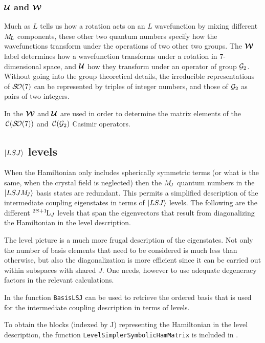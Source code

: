 \documentclass{article}
\newcommand{\codetext}[1]{{\color{BlueViolet} \texttt{#1}}}
\begin{document}
\subsubsection{$\boldsymbol{\mathcal{U}}$ and $\boldsymbol{\mathcal{W}}$}

Much as $L$ tells us how a rotation acts on an $L$ wavefunction by mixing different $M_{\!{L}}$ components, these other two quantum numbers specify how the wavefunctions transform under the operations of two other two groups. The $\boldsymbol{\mathcal{W}}$ label determines how a wavefunction transforms under a rotation in 7-dimensional space, and $\boldsymbol{\mathcal{U}}$ how they transform under an operator of group $\mathcal{G}_2$. Without going into the group theoretical details, the irreducible representations of $\mathcal{S\!O}(7)$ can be represented by triples of integer numbers, and those of $\mathcal{G}_2$ as pairs of two integers.

In \qlanth the $\boldsymbol{\mathcal{W}}$ and $\boldsymbol{\mathcal{U}}$ are used in order to determine the matrix elements of the $\,\mathcal{C}(\mathcal{S\!O}(7))$ and $\,\mathcal{C}(\mathcal{G}_2)$ Casimir operators.

\subsection{$|LSJ\rangle$ levels}

When the Hamiltonian only includes spherically symmetric terms (or what is the same, when the crystal field is neglected) then the $M_{\!{J}}$ quantum numbers in the $|LSJM_{\!{J}}\rangle$ basis states are redundant. This permits a simplified description of the intermediate coupling eigenstates in terms of $|LSJ\rangle$ levels. The following are the different ${}^{2S+1}{\kern-0.1em}{\text{L}}_{J}$ levels that span the eigenvectors that result from diagonalizing the Hamiltonian in the level description.



The level picture is a much more frugal description of the eigenstates. Not only the number of basis elements that need to be considered is much less than otherwise, but also the diagonalization is more efficient since it can be carried out within subspaces with shared $J$. One needs, however to use adequate degeneracy factors in the relevant calculations.

In \qlanth the function \codetext{BasisLSJ} can be used to retrieve the ordered basis that is used for the intermediate coupling description in terms of levels.



To obtain the blocks (indexed by J) representing the Hamiltonian in the level description, the function \codetext{LevelSimplerSymbolicHamMatrix} is included in \qlanth.
\end{document}
